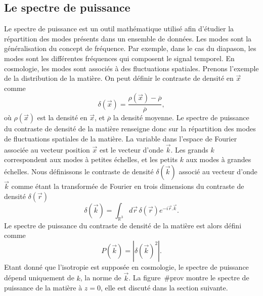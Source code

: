 \documentclass[11pt, twoside, a4paper, openright]{report}
\begin{document}
\subsection{Le spectre de puissance}
Le spectre de puissance est un outil mathématique utilisé afin d'étudier la répartition des modes présents dans un ensemble de données. Les modes sont la généralisation du concept de fréquence. Par exemple, dans le cas du diapason, les modes sont les différentes fréquences qui composent le signal temporel. En cosmologie, les modes sont associés à des fluctuations spatiales. Prenons l'exemple de la distribution de la matière. On peut définir le contraste de densité en $\vec x$ comme
\begin{equation}
  \label{eq:contraste}
  \delta(\vec x) = \frac{\rho(\vec x) - \overline \rho}{\overline\rho} ,
\end{equation}
où $\rho(\vec x)$ est la densité en $\vec x$, et $\overline \rho$ la densité moyenne. Le spectre de puissance du contraste de densité de la matière renseigne donc sur la répartition des modes de fluctuations spatiales de la matière. La variable dans l'espace de Fourier associée au vecteur position $\vec x$ est le vecteur d'onde $\vec k$. Les grands $k$ correspondent aux modes à petites échelles, et les petits $k$ aux modes à grandes échelles.
Nous définissons le contraste de densité $\delta(\vec k)$ associé au vecteur d'onde $\vec k$ comme étant la transformée de Fourier en trois dimensions du contraste de densité $\delta(\vec r)$
\begin{equation}
  \label{eq:delta_k}
  \delta(\vec k) = \int_{\mathbb{R}^{3}} d\vec r \,\delta(\vec r) e^{-i \vec r . \vec k}.
\end{equation}
Le spectre de puissance du contraste de densité de la matière est alors défini comme
\begin{equation}
  \label{eq:def_pow_spec}
  P(\vec{k}) = | \delta(\vec k)^{2} | .
\end{equation}
Etant donné que l'isotropie est supposée en cosmologie, le spectre de puissance dépend uniquement de $k$, la norme de $\vec{k}$. La figure~\#prov montre le spectre de puissance de la matière à $z=0$, elle est discuté dans la section suivante.
\end{document}
